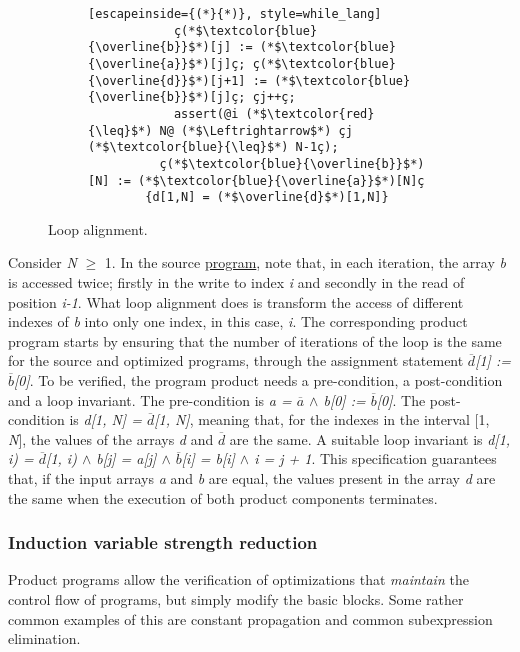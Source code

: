 \begin{figure}
\begin{subfigure}[b]{0.9\textwidth}
\begin{minipage}[t]{\linewidth}
\begin{lstlisting}[escapeinside={(*}{*)}, style=while_lang]
            ç(*$\textcolor{blue}{\overline{b}}$*)[j] := (*$\textcolor{blue}{\overline{a}}$*)[j]ç; ç(*$\textcolor{blue}{\overline{d}}$*)[j+1] := (*$\textcolor{blue}{\overline{b}}$*)[j]ç; çj++ç;
            assert(@i (*$\textcolor{red}{\leq}$*) N@ (*$\Leftrightarrow$*) çj (*$\textcolor{blue}{\leq}$*) N-1ç);
          ç(*$\textcolor{blue}{\overline{b}}$*)[N] := (*$\textcolor{blue}{\overline{a}}$*)[N]ç
        {d[1,N] = (*$\overline{d}$*)[1,N]}
      \end{lstlisting}
    \end{minipage}
  \end{subfigure}
  \caption{Loop alignment.}
  \label{fig:loop_alignment}
\end{figure}

Consider \emph{N} $\geq$ 1.
In the source \hyperref[fig:loop_alignment]{program}, note that, in each iteration, the array \emph{b} is accessed twice; firstly in the write to index \emph{i} and secondly in the read of position \emph{i-1}.
What loop alignment does is transform the access of different indexes of \emph{b} into only one index, in this case, \emph{i}.
The corresponding product program starts by ensuring that the number of iterations of the loop is the same for the source and optimized programs, through the assignment statement \emph{$\overline{d}$[1] := $\overline{b}$[0]}.
To be verified, the program product needs a pre-condition, a post-condition and a loop invariant.
The pre-condition is \emph{a = $\overline{a}$ $\land$ b[0] := $\overline{b}$[0]}.
The post-condition is \emph{d[1, N] = $\overline{d}$[1, N]}, meaning that, for the indexes in the interval [1, \emph{N}], the values of the arrays \emph{d} and \emph{$\overline{d}$} are the same.
A suitable loop invariant is \emph{d[1, i) = $\overline{d}$[1, i)  $\land$  b[j] = a[j]  $\land$  $\overline{b}$[i] = b[i]  $\land$  i = j + 1}.
This specification guarantees that, if the input arrays \emph{a} and \emph{b} are equal, the values present in the array \emph{d} are the same when the execution of both product components terminates.

\FloatBarrier
\subsubsection{Induction variable strength reduction} 
\label{subsubsec:product_programs_strength_reduction}

Product programs allow the verification of optimizations that \emph{maintain} the control flow of programs, but simply modify the basic blocks.
Some rather common examples of this are constant propagation and common subexpression elimination.

